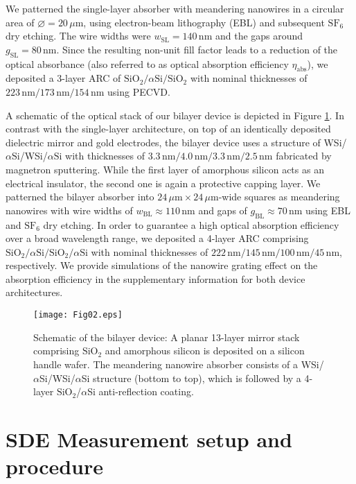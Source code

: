 \documentclass[aip,apl,showpacs,showkeys,preprint,superscriptaddress,preprintnumbers,amsmath,amssymb]{revtex4-1}
\begin{document}
\begin{bibunit}
We patterned the single-layer absorber with meandering nanowires in a circular area of $\diameter=20\,\mu\mathrm{m}$, using electron-beam lithography (EBL) and subsequent $\mathrm{SF}_6$ dry etching. The wire widths were $w_\mathrm{SL}=140\,\mathrm{nm}$ and the gaps around $g_\mathrm{SL}=80\,\mathrm{nm}$. Since the resulting non-unit fill factor leads to a reduction of the optical absorbance (also referred to as optical absorption efficiency $\eta_\mathrm{abs}$), we deposited a 3-layer ARC of $\mathrm{SiO}_2/\alpha\mathrm{Si}/\mathrm{SiO}_2$ with nominal thicknesses of $223\,\mathrm{nm}/173\,\mathrm{nm}/154\,\mathrm{nm}$ using PECVD.

A schematic of the optical stack of our bilayer device is depicted in Figure \ref{fig:02}.  In contrast with the single-layer architecture, on top of an identically deposited dielectric mirror and gold electrodes, the bilayer device uses a structure of WSi/$\alpha\mathrm{Si}$/WSi/$\alpha\mathrm{Si}$ with thicknesses of $3.3\,\mathrm{nm}/4.0\,\mathrm{nm}/3.3\,\mathrm{nm}/2.5\,\mathrm{nm}$ fabricated by magnetron sputtering. While the first layer of amorphous silicon acts as an electrical insulator, the second one is again a protective capping layer. We patterned the bilayer absorber into $24\,\mu\mathrm{m}\times24\,\mu\mathrm{m}$-wide squares as meandering nanowires with wire widths of $w_\mathrm{BL}\approx110\,\mathrm{nm}$ and gaps of $g_\mathrm{BL}\approx70\,\mathrm{nm}$ using EBL and $\mathrm{SF}_6$ dry etching. In order to guarantee a high optical absorption efficiency over a broad wavelength range, we deposited a 4-layer ARC comprising $\mathrm{SiO}_2/\alpha\mathrm{Si}/\mathrm{SiO}_2/\alpha\mathrm{Si}$ with nominal thicknesses of $222\,\mathrm{nm}/145\,\mathrm{nm}/100\,\mathrm{nm}/45\,\mathrm{nm}$, respectively. We provide simulations of the nanowire grating effect on the absorption efficiency in the supplementary information for both device architectures.

\begin{figure}
\texttt{[image: Fig02.eps]}
\caption{\label{fig:02} Schematic of the bilayer device: A planar 13-layer mirror stack comprising $\mathrm{SiO}_2$ and amorphous silicon is deposited on a silicon handle wafer. The meandering nanowire absorber consists of a WSi/$\alpha$Si/WSi/$\alpha$Si structure (bottom to top), which is followed by a 4-layer $\mathrm{SiO}_2$/$\alpha$Si anti-reflection coating.}
\end{figure}


\section{SDE Measurement setup and procedure}


\end{bibunit}
\end{document}
